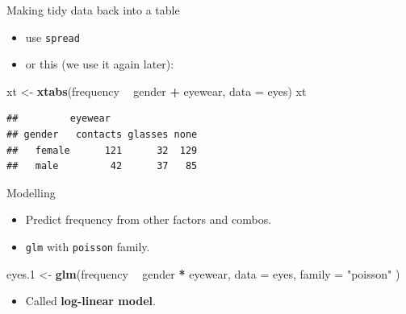 \documentclass[
  ignorenonframetext,
]{beamer}
\newenvironment{Shaded}{\begin{snugshade}}{\end{snugshade}}
\newcommand{\DataTypeTok}[1]{\textcolor[rgb]{0.13,0.29,0.53}{#1}}
\newcommand{\FloatTok}[1]{\textcolor[rgb]{0.00,0.00,0.81}{#1}}
\newcommand{\KeywordTok}[1]{\textcolor[rgb]{0.13,0.29,0.53}{\textbf{#1}}}
\newcommand{\NormalTok}[1]{#1}
\newcommand{\OperatorTok}[1]{\textcolor[rgb]{0.81,0.36,0.00}{\textbf{#1}}}
\newcommand{\StringTok}[1]{\textcolor[rgb]{0.31,0.60,0.02}{#1}}
\providecommand{\tightlist}{%
  \setlength{\itemsep}{0pt}\setlength{\parskip}{0pt}}
\begin{document}
\begin{frame}[fragile]{Making tidy data back into a table}
\protect\hypertarget{making-tidy-data-back-into-a-table}{}

\begin{itemize}
\tightlist
\item
  use \texttt{spread}
\item
  or this (we use it again later):
\end{itemize}

\begin{Shaded}
\begin{Highlighting}[]
\NormalTok{xt <-}\StringTok{ }\KeywordTok{xtabs}\NormalTok{(frequency }\OperatorTok{~}\StringTok{ }\NormalTok{gender }\OperatorTok{+}\StringTok{ }\NormalTok{eyewear, }\DataTypeTok{data =}\NormalTok{ eyes)}
\NormalTok{xt}
\end{Highlighting}
\end{Shaded}

\begin{verbatim}
##         eyewear
## gender   contacts glasses none
##   female      121      32  129
##   male         42      37   85
\end{verbatim}

\end{frame}

\begin{frame}[fragile]{Modelling}
\protect\hypertarget{modelling}{}

\begin{itemize}
\tightlist
\item
  Predict frequency from other factors and combos.
\item
  \texttt{glm} with \texttt{poisson} family.
\end{itemize}

\begin{Shaded}
\begin{Highlighting}[]
\NormalTok{eyes}\FloatTok{.1}\NormalTok{ <-}\StringTok{ }\KeywordTok{glm}\NormalTok{(frequency }\OperatorTok{~}\StringTok{ }\NormalTok{gender }\OperatorTok{*}\StringTok{ }\NormalTok{eyewear,}
  \DataTypeTok{data =}\NormalTok{ eyes,}
  \DataTypeTok{family =} \StringTok{"poisson"}
\NormalTok{)}
\end{Highlighting}
\end{Shaded}

\begin{itemize}
\tightlist
\item
  Called \textbf{log-linear model}.
\end{itemize}

\end{frame}
\end{document}

